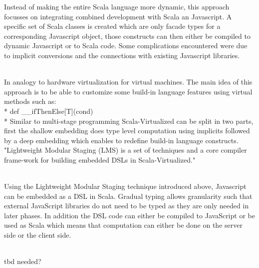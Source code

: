 Instead of making the entire Scala language more dynamic, this approach focusses on integrating combined development with Scala an Javascript. A specific set of Scala classes is created which are only facade types for a corresponding Javascript object, those constructs can then either be compiled to dynamic Javascript or to Scala code. Some complications encountered were due to implicit conversions and the connections with existing Javascript libraries.
\\
\\

In analogy to hardware virtualization for virtual machines. The main idea of this approach is to be able to customize some build-in language features using virtual methods such as:\\*
{\ttfamily def \_\_ifThenElse[T](cond) }\\*
Similar to multi-stage programming Scala-Virtualized can be split in two parts, first the shallow embedding does type level computation using implicits followed by a deep embedding which enables to redefine build-in language constructs. "Lightweight Modular Staging (LMS) is a set of techniques and a core compiler frame-work for building embedded DSLs in Scala-Virtualized."
\\
\\

Using the Lightweight Modular Staging technique introduced above, Javascript can be embedded as a DSL in Scala. Gradual typing allows granularity such that external JavaScript libraries do not need to be typed as they are only needed in later phases. In addition the DSL code can either be compiled to JavaScript or be used as Scala which means  that computation can either be done on the server side or the client side. 
\\
\\

tbd needed?
\\
\\

